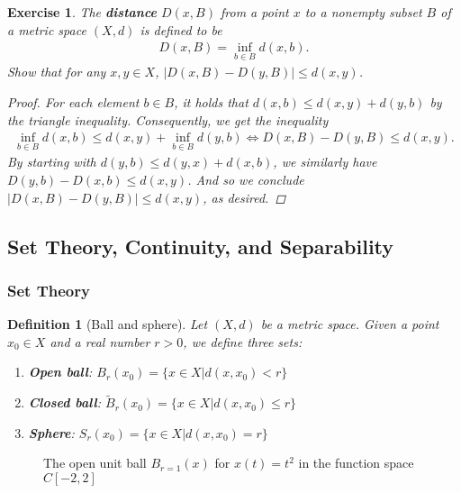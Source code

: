 \documentclass[11pt]{article}
\theoremstyle{mystyle}
\newtheorem{defn}{Definition}[section]
\newtheorem{protoexer}{Exercise}[section]
\newenvironment{exer}
{\colorlet{shadecolor}{blue!15}\begin{shaded}\begin{protoexer}}
{\end{protoexer}\end{shaded}}
\begin{document}
\newpage
\begin{exer}\label{pttoset}
The \textbf{distance} $D(x, B)$ from a point $x$ to a nonempty subset $B$ of a metric space $(X, d)$ is defined to be
\begin{align*}
    D(x, B) = \inf_{b \in B} d(x, b).
\end{align*}
Show that for any $x, y \in X$, $|D(x, B) - D(y, B)| \leq d(x, y)$.
\begin{proof}
For each element $b \in B$, it holds that $d(x,b) \leq d(x, y) + d(y, b)$ by the triangle inequality. Consequently, we get the inequality 
\begin{align*}
    \inf_{b \in B} d(x, b) \leq d(x, y) + \inf_{b \in B} d(y, b) \iff D(x, B) - D(y, B) \leq d(x, y).
\end{align*}
By starting with $d(y, b) \leq d(y, x) + d(x, b)$, we similarly have $D(y, b) - D(x, b) \leq d(x, y)$. And so we conclude $|D(x, B) - D(y, B)| \leq d(x, y)$, as desired.
\end{proof}
\end{exer}

\subsection{Set Theory, Continuity, and Separability}

\subsubsection{Set Theory}\label{settheory}

\begin{defn}[Ball and sphere]
Let $(X, d)$ be a metric space. Given a point $x_0 \in X$ and a real number $r > 0$, we define three sets:
\begin{enumerate}
    \item \textbf{Open ball}: $B_r(x_0) = \{x \in X | d(x, x_0) < r \}$
    \item \textbf{Closed ball}: $\tilde{B}_r(x_0) = \{x \in X | d(x, x_0) \leq r \}$
    \item \textbf{Sphere}: $S_r(x_0) = \{x \in X | d(x, x_0) = r \}$
\end{enumerate}
\end{defn}

\begin{figure}[H]
\begin{center}
\end{center}
\caption*{The open unit ball $B_{r=1}(x)$ for $x(t) = t^2$ in the function space $C[-2, 2]$}
\end{figure}
\end{document}
